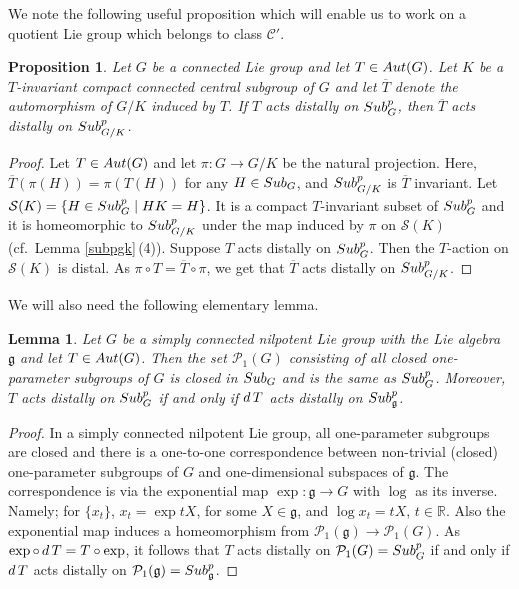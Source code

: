 \documentclass{amsart}
\numberwithin{equation}{section}
\newcommand{\Aut}{{\rm Aut}}
\newcommand{\Sub}{{\rm Sub}}
\newcommand{\R}{{\mathbb R}}
\newcommand{\gf}{{\mathfrak g}}
\newcommand{\cS}{{\mathcal S}}
\newcommand{\spg}{{\rm Sub}^p_G}
\newcommand{\spp}{{\rm Sub}^{p}}
\newcommand{\du}{{\rm d\,}}
\let\ol=\overline
\newtheorem{lem}[thm]{Lemma}
\newtheorem{prop}[thm]{Proposition}
\theoremstyle{remark}
\newcommand{\cp}{{\mathcal{C}'}}
\newcommand{\cP}{{\mathcal{P}}}
\begin{document}
We note the following useful proposition which will enable us to work on a quotient Lie group which belongs to class $\cp$.

\begin{prop} \label{gk}
Let $G$ be a connected Lie group and let $T\in\Aut(G)$. Let $K$ be a $T$-invariant compact connected 
central subgroup of $G$ and let $\ol{T}$ denote the automorphism of $G/K$ induced by $T$. 
If $T$ acts distally on $\spg$, then $\ol{T}$ acts distally on $\spp_{G/K}$. 
\end{prop}

\begin{proof} Let $T\in\Aut(G)$ and let $\pi:G\to G/K$ be the natural projection. Here,
$\ol{T}(\pi(H))=\pi(T(H))$ for any $H\in\Sub_G$, and $\spp_{G/K}$ is $\ol{T}$ invariant. 
Let $\cS(K)=\{H\in \spg\mid HK=H\}$. It is a compact $T$-invariant subset of $\spg$ and it is 
homeomorphic to $\spp_{G/K}$ under the map induced by $\pi$ on $\cS(K)$ (cf.\ Lemma \ref{subpgk}\,(4)). 
Suppose $T$ acts distally on $\spg$. Then the $T$-action on $\cS(K)$ is distal. As $\pi\circ T=\ol{T}\circ\pi$, 
we get that $\ol{T}$ acts distally on $\spp_{G/K}$. 
\end{proof}
 
 We will also need the following elementary lemma. 
 
 \begin{lem} \label{scn}
Let $G$ be a simply connected nilpotent Lie group with the Lie algebra $\gf$ and let $T\in \Aut(G)$. 
Then the set $\cP_1(G)$ consisting of all closed one-parameter subgroups of $G$ is closed in $\Sub_G$ 
and is the same as $\spg$. Moreover, $T$ acts distally on $\spg$ if and only if $\du T$ acts distally on $\spp_\gf$. 
\end{lem}

\begin{proof}
In a simply connected nilpotent Lie group, all one-parameter subgroups are closed 
and there is a one-to-one correspondence between non-trivial (closed) one-parameter subgroups of $G$
and one-dimensional subspaces of $\gf$. The correspondence is via the exponential map $\exp: \gf\to G$ with 
$\log$ as its inverse. Namely; for $\{x_t\}$, $x_t=\exp tX$, for some $X\in\gf$, and $\log x_t=tX$, $t\in\R$.
Also the exponential map induces a homeomorphism from $\cP_1(\gf)\to\cP_1(G)$. 
As $\exp\circ\,\du T=T\circ\exp$, it follows that $T$ acts distally on $\cP_1(G)=\spg$ if and
only if $\du T$ acts distally on $\cP_1(\gf)=\spp_\gf$. 
\end{proof}
\end{document}
